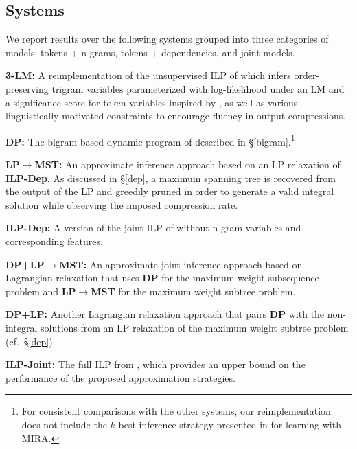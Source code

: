 \documentclass[11pt,a4paper]{article}
\newenvironment{packed_itemize}{
\begin{itemize}
  \setlength{\itemsep}{1pt}
  \setlength{\parskip}{0pt}
  \setlength{\parsep}{0pt}
}{\end{itemize}}
\begin{document}
\subsection{Systems}
\label{systems}
We report results over the following systems grouped into three
categories of models:
tokens + n-grams, tokens + dependencies, and joint models.
\begin{packed_itemize}
\item \textbf{3-LM:} A reimplementation of the unsupervised ILP
    of  which infers order-preserving trigram variables
    parameterized with log-likelihood under an LM and
    a significance score for token variables inspired by
    , as well as various linguistically-motivated
    constraints to encourage fluency in output compressions.
\item \textbf{DP:} The bigram-based dynamic program of
     described in \S\ref{bigram}.\footnote{For
        consistent comparisons with the
        other systems, our reimplementation does not include the
        $k$-best inference strategy presented in 
        for learning with MIRA.}
\item \textbf{LP$\rightarrow$MST:} An approximate inference approach
    based on an LP relaxation of \textbf{ILP-Dep}. As discussed
    in \S\ref{dep}, a maximum spanning tree is recovered
    from the output of the LP and greedily pruned in order to generate a
    valid integral solution while observing the imposed compression rate.
\item \textbf{ILP-Dep:} A version of the joint ILP of 
    without n-gram variables and corresponding features.
\item \textbf{DP+LP$\rightarrow$MST:} An approximate joint inference approach
    based on Lagrangian relaxation that uses \textbf{DP} for the maximum
    weight subsequence problem and \textbf{LP$\rightarrow$MST} for the
    maximum weight subtree problem.
\item \textbf{DP+LP:} Another Lagrangian relaxation approach that pairs
    \textbf{DP}
    with the non-integral solutions from an LP relaxation of the
    maximum weight subtree problem (cf.~\S\ref{dep}).
\item \textbf{ILP-Joint:} The full ILP from ,
    which provides an upper bound on the performance of the proposed
    approximation strategies.
\end{packed_itemize}
\end{document}
